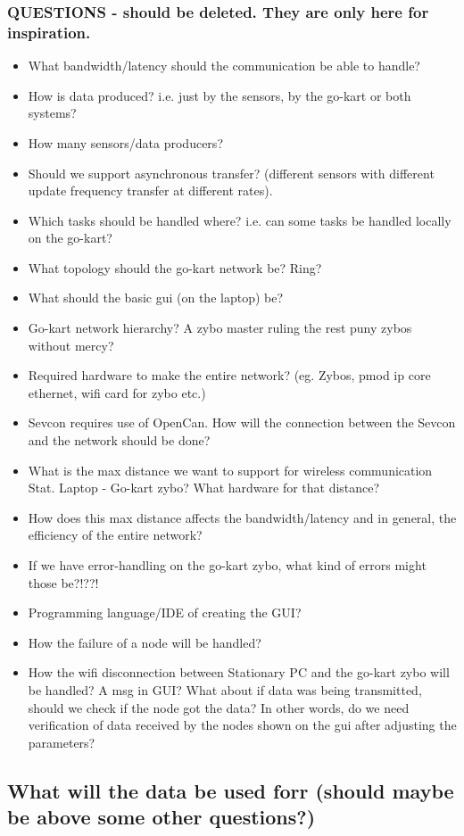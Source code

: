 \subsubsection{QUESTIONS - should be deleted. They are only here for inspiration.}
\begin{itemize}{}
\item What bandwidth/latency should the communication be able to handle?
\item How is data produced? i.e. just by the sensors, by the go-kart or both systems?
\item How many sensors/data producers?\\
\item Should we support asynchronous transfer? (different sensors with different 
update frequency transfer at different rates).\\
\item Which tasks should be handled where? i.e. can some tasks be handled locally on 
the go-kart?
\item What topology should the go-kart network be? Ring?
\item What should the basic gui (on the laptop) be?
\item Go-kart network hierarchy? A zybo master ruling the rest puny zybos without mercy?
\item Required hardware to make the entire network? (eg. Zybos, pmod ip core ethernet, wifi card for zybo etc.)
\item Sevcon requires use of OpenCan. How will the connection between the Sevcon and the network should be done?
\item What is the max distance we want to support for wireless communication Stat. Laptop - Go-kart zybo? What hardware for that distance?
\item How does this max distance affects the bandwidth/latency and in general, the efficiency of the entire network?
\item If we have error-handling on the go-kart zybo, what kind of errors might those be?!??!
\item Programming language/IDE of creating the GUI?
\item How the failure of a node will be handled?
\item How the wifi disconnection between Stationary PC and the go-kart zybo will be handled? A msg in GUI? What about if data was being transmitted, should we check if the node got the data? In other words, do we need verification of data received by the nodes shown on the gui after adjusting the parameters?

\end{itemize}

\subsection{What will the data be used forr (should maybe be above some other questions?)}



